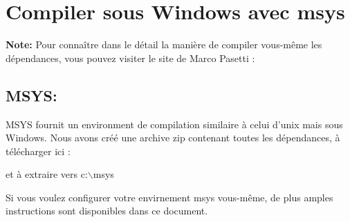 %
%
%
%
%
%
%

\section{Compiler sous Windows avec msys}\label{sec:install_windows}
\textbf{Note:} Pour conna\^itre dans le d\'etail la mani\`ere de compiler vous-m\^eme
les d\'ependances, vous pouvez visiter le site de Marco Pasetti :


\subsection{MSYS:}
MSYS fournit un environment de compilation similaire \`a celui d'unix mais sous
Windows. Nous avons cr\'e\'e une archive zip contenant toutes les d\'ependances, \`a
t\'el\'echarger ici : 


et \`a extraire vers c:$\backslash$msys

Si vous voulez configurer votre envirnement msys vous-m\^eme, de plus amples
instructions sont disponibles dans ce document.

